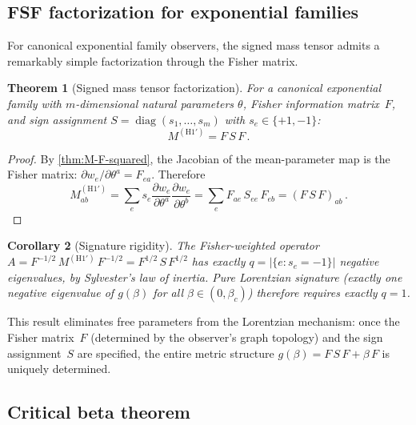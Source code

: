 \documentclass[11pt]{article}
\newtheorem{theorem}{Theorem}[section]
\newtheorem{corollary}[theorem]{Corollary}
\theoremstyle{definition}
\theoremstyle{remark}
\begin{document}
\subsection{FSF factorization for exponential families}
\label{sec:FSF-factorization}

For canonical exponential family observers, the signed mass tensor admits
a remarkably simple factorization through the Fisher matrix.

\begin{theorem}[Signed mass tensor factorization]
\label{thm:FSF}
For a canonical exponential family with $m$-dimensional natural parameters
$\theta$, Fisher information matrix~$F$, and sign assignment
$S = \operatorname{diag}(s_1, \ldots, s_m)$ with $s_e \in \{+1, -1\}$:
\begin{equation}
\label{eq:FSF}
M^{(\mathrm{H1'})} = F\,S\,F\,.
\end{equation}
\end{theorem}

\begin{proof}
By \cref{thm:M-F-squared}, the Jacobian of the mean-parameter map is
the Fisher matrix: $\partial w_e / \partial \theta^a = F_{ea}$.
Therefore
\begin{equation}
M^{(\mathrm{H1'})}_{ab}
= \sum_e s_e \frac{\partial w_e}{\partial \theta^a}
\frac{\partial w_e}{\partial \theta^b}
= \sum_e F_{ae}\, S_{ee}\, F_{eb}
= (F\,S\,F)_{ab}\,.
\end{equation}
\end{proof}

\begin{corollary}[Signature rigidity]
\label{cor:signature-rigidity}
The Fisher-weighted operator
$A = F^{-1/2}\, M^{(\mathrm{H1'})}\, F^{-1/2} = F^{1/2}\, S\, F^{1/2}$
has exactly $q = |\{e : s_e = -1\}|$ negative eigenvalues, by
Sylvester's law of inertia.
Pure Lorentzian signature (exactly one negative eigenvalue of $g(\beta)$
for all $\beta \in (0, \beta_c)$) therefore requires exactly $q = 1$.
\end{corollary}

This result eliminates free parameters from the Lorentzian mechanism:
once the Fisher matrix~$F$ (determined by the observer's graph topology)
and the sign assignment~$S$ are specified, the entire metric structure
$g(\beta) = F\,S\,F + \beta\,F$ is uniquely determined.

\subsection{Critical beta theorem}
\label{sec:beta-c-theorem}
\end{document}
